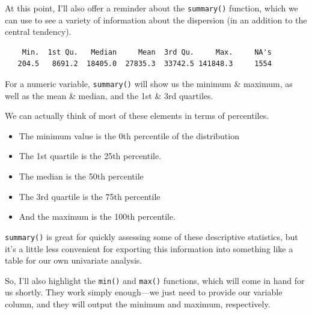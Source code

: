 \documentclass[
  letterpaper,
  DIV=11,
  numbers=noendperiod]{scrreprt}
\newenvironment{Shaded}{\begin{snugshade}}{\end{snugshade}}
\newcommand{\AttributeTok}[1]{\textcolor[rgb]{0.40,0.45,0.13}{#1}}
\newcommand{\ConstantTok}[1]{\textcolor[rgb]{0.56,0.35,0.01}{#1}}
\newcommand{\FunctionTok}[1]{\textcolor[rgb]{0.28,0.35,0.67}{#1}}
\newcommand{\NormalTok}[1]{\textcolor[rgb]{0.00,0.23,0.31}{#1}}
\newcommand{\SpecialCharTok}[1]{\textcolor[rgb]{0.37,0.37,0.37}{#1}}
\begin{document}
At this point, I'll also offer a reminder about the \texttt{summary()}
function, which we can use to see a variety of information about the
dispersion (in an addition to the central tendency).

\begin{Shaded}
\end{Shaded}

\begin{verbatim}
    Min.  1st Qu.   Median     Mean  3rd Qu.     Max.     NA's 
   204.5   8691.2  18405.0  27835.3  33742.5 141848.3     1554 
\end{verbatim}

For a numeric variable, \texttt{summary()} will show us the minimum \&
maximum, as well as the mean \& median, and the 1st \& 3rd quartiles.

We can actually think of most of these elements in terms of percentiles.

\begin{itemize}
\item
  The minimum value is the 0th percentile of the distribution
\item
  The 1st quartile is the 25th percentile.
\item
  The median is the 50th percentile
\item
  The 3rd quartile is the 75th percentile
\item
  And the maximum is the 100th percentile.
\end{itemize}

\texttt{summary()} is great for quickly assessing some of these
descriptive statistics, but it's a little less convenient for exporting
this information into something like a table for our own univariate
analysis.

So, I'll also highlight the \texttt{min()} and \texttt{max()} functions,
which will come in hand for us shortly. They work simply enough---we
just need to provide our variable column, and they will output the
minimum and maximum, respectively.

\begin{Shaded}
\end{Shaded}
\end{document}
